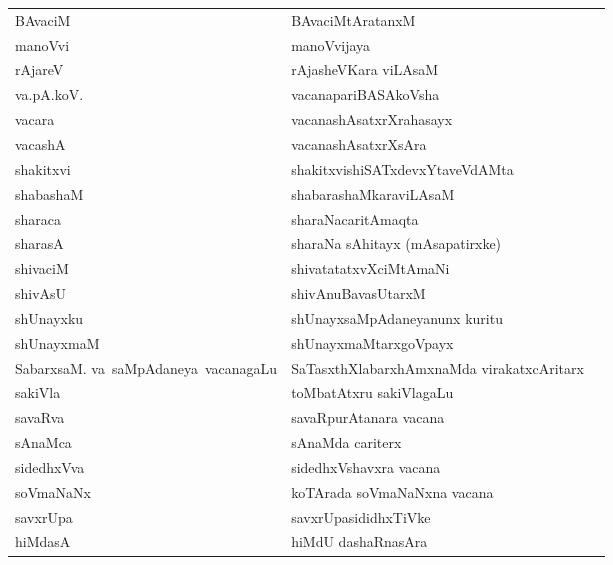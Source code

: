 {\begin{longtable}{>{\raggedright}p{3.5cm}ll}
BAvaciM & BAvaciMtAratanxM & \\
manoVvi & manoVvijaya & \\
rAjareV & rAjasheVKara viLAsaM & \\
va.pA.koV. & vacanapariBASAkoVsha & \\
vacara & vacanashAsatxrXrahasayx & \\
vacashA & vacanashAsatxrXsAra & \\
shakitxvi & shakitxvishiSATxdevxYtaveVdAMta & \\
shabashaM & shabarashaMkaraviLAsaM & \\
sharaca & sharaNacaritAmaqta & \\
sharasA & sharaNa sAhitayx (mAsapatirxke) & \\
shivaciM & shivatatatxvXciMtAmaNi & \\
shivAsU & shivAnuBavasUtarxM & \\
shUnayxku & shUnayxsaMpAdaneyanunx kuritu &\\
shUnayxmaM & shUnayxmaMtarxgoVpayx & \\
SabarxsaM. \hbox{va saMpAdaneya vacanagaLu} & SaTasxthXlabarxhAmxnaMda virakatxcAritarx & \\
sakiVla & toMbatAtxru sakiVlagaLu & \\
savaRva & savaRpurAtanara vacana & \\
sAnaMca & sAnaMda cariterx & \\
sidedhxVva & sidedhxVshavxra vacana & \\
soVmaNaNx & koTArada soVmaNaNxna vacana & \\
savxrUpa & savxrUpasididhxTiVke & \\
hiMdasA & hiMdU dashaRnasAra & \\
\hline
\end{longtable}}


\newpage

